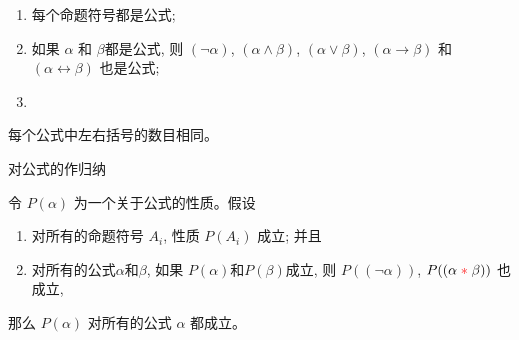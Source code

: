 \begin{frame}{}
  \begin{definition}[公式 (Formula)]
    \begin{enumerate}[(1)]
      \setlength{\itemsep}{8pt}
      \item 每个命题符号都是公式;
      \item 如果 $\alpha$ 和 $\beta$都是公式,
        则 $(\lnot \alpha)$, $(\alpha \land \beta)$, $(\alpha \lor \beta)$,
        $(\alpha \to \beta)$ 和 $(\alpha \leftrightarrow \beta)$ 也是公式;
      \item {}
    \end{enumerate}
  \end{definition}
\end{frame}

\begin{frame}{}
  \begin{lemma}[公式的括号匹配性质]
    每个公式中左右括号的数目相同。
  \end{lemma}

  \pause
  \vspace{0.60cm}
  \begin{center}

    \pause
    \vspace{0.50cm}
    {\large 对公式的作归纳}
  \end{center}
\end{frame}

\begin{frame}{}
  \begin{theorem}[归纳原理]
    令 $P(\alpha)$ 为一个关于公式的性质。假设
    \begin{enumerate}[(1)]
      \setlength{\itemsep}{8pt}
      \item 对所有的命题符号 $A_{i}$, 性质 $P(A_{i})$ 成立; 并且
      \item 对所有的公式$\alpha$和$\beta$, 如果 $P(\alpha)$和$P(\beta)$成立,
        则 $P((\lnot \alpha))$, $P((\alpha \;\textcolor{red}{\ast}\; \beta))$ 也成立,
    \end{enumerate}
    那么 $P(\alpha)$ 对所有的公式 $\alpha$ 都成立。
  \end{theorem}
\end{frame}

